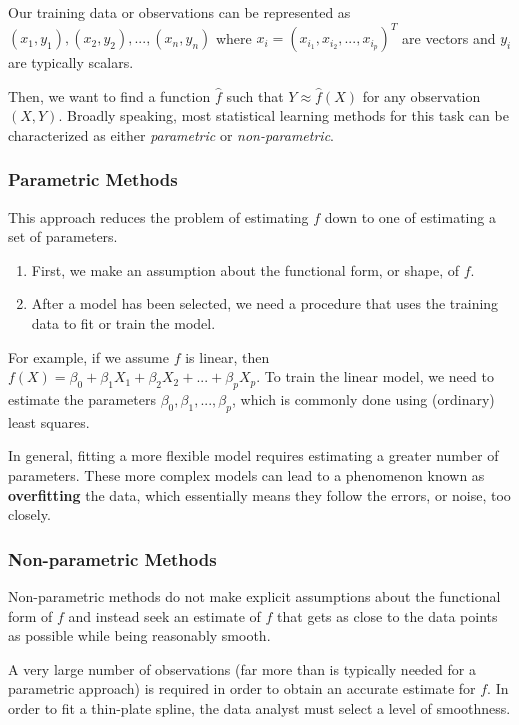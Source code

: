 \documentclass{article}
\numberwithin{equation}{section}
\begin{document}
Our training data or observations can be represented as ${(x_1, y_1),(x_2, y_2),...,(x_n, y_n)}$ where $x_i = (x_{i_1}, x_{i_2},...,x_{i_p})^T$ are vectors and $y_i$ are typically scalars.

Then, we want to find a function $\hat f$ such that $Y \approx \hat f(X)$ for any observation $(X, Y)$. Broadly speaking, most statistical learning methods for this task can be characterized as either \textit{parametric} or \textit{non-parametric}.

\subsubsection*{Parametric Methods}

This approach reduces the problem of estimating $f$ down to one of estimating a set of parameters.

\begin{enumerate}
    \item First, we make an assumption about the functional form, or shape, of $f$.
    
    \item After a model has been selected, we need a procedure that uses the training data to fit or train the model.
\end{enumerate}

For example, if we assume $f$ is linear, then $f(X) = \beta_0 + \beta_1X_1 + \beta_2X_2 + ... + \beta_p X_p$. To train the linear model, we need to estimate the parameters $\beta_0, \beta_1,..., \beta_p$, which is commonly done using (ordinary) least squares.


In general, fitting a more flexible model requires estimating a
greater number of parameters. These more complex models can lead to a phenomenon known as \textbf{overfitting} the data, which essentially means they follow the errors, or noise, too closely.

\subsubsection*{Non-parametric Methods}
Non-parametric methods do not make explicit assumptions about the functional form of $f$ and instead seek an estimate of $f$ that gets as close to the data points as possible while being reasonably smooth.

A very large number of observations (far more than is typically needed for a parametric approach) is required in order to obtain an accurate estimate for $f$. In order to fit a thin-plate spline, the data analyst must select a level of smoothness.
\end{document}
